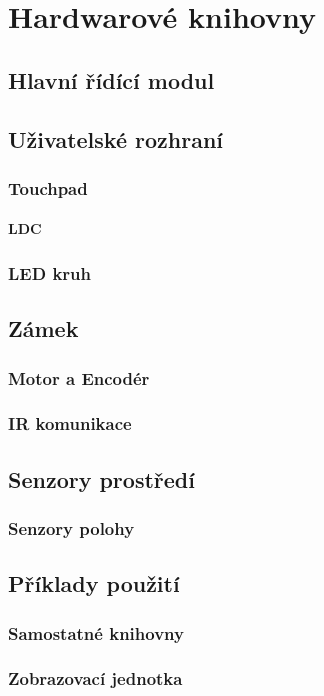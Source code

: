 \chapter{Hardwarové knihovny}

\section{Hlavní řídící modul}

\section{Uživatelské rozhraní}
\subsection{Touchpad}
\subsubsection{LDC}
\subsection{LED kruh}

\section{Zámek}
\subsection{Motor a Encodér}
\subsection{IR komunikace}

\section{Senzory prostředí}
\subsection{Senzory polohy}

\section{Příklady použití}
\subsection{Samostatné knihovny}
\subsection{Zobrazovací jednotka}
